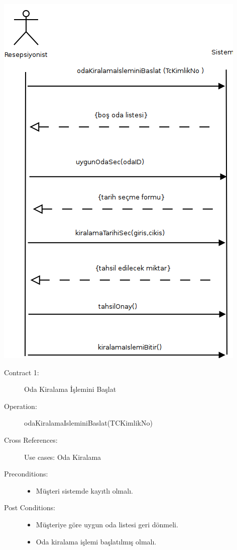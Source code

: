 \documentclass[12pt,a4paper]{report}
\begin{document}
\begin{center}
\includegraphics{dia/ssd-usecase2.png}
\end{center}

\newpage


\begin{description}
\item[Contract 1:] Oda Kiralama İşlemini Başlat
\item[Operation:] odaKiralamaIsleminiBaslat(TCKimlikNo)
\item[Cross References:] Use cases: Oda Kiralama
\item[Preconditions:] \hspace{10 mm}
\begin{itemize}
\item Müşteri sistemde kayıtlı olmalı.
\end{itemize}
\item[Post Conditions:] \hspace{10 mm}
\begin{itemize} 
\item Müşteriye göre uygun oda listesi geri dönmeli.
\item Oda kiralama işlemi başlatılmış olmalı. \\
\end{itemize}
\end{description}
\end{document}
